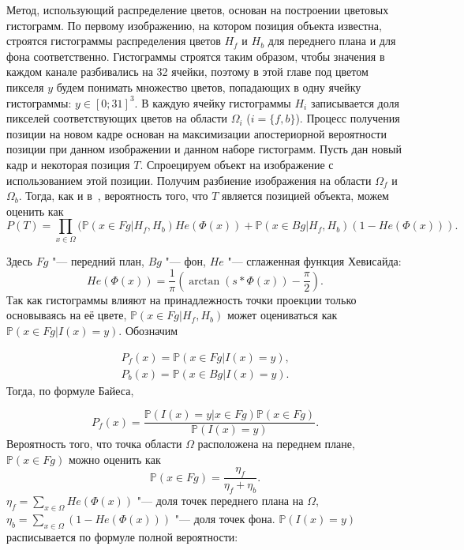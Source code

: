 Метод, использующий распределение цветов, основан на построении цветовых
гистограмм. По первому изображению, на котором позиция объекта известна,
строятся гистограммы распределения цветов $H_f$ и $H_b$ для переднего плана и
для фона соответственно. Гистограммы строятся таким образом, чтобы значения в
каждом канале разбивались на 32 ячейки, поэтому в этой главе под цветом пикселя
$y$ будем понимать множество цветов, попадающих в одну ячейку гистограммы: $y
\in [0; 31]^3$. В каждую ячейку гистограммы $H_i$ записывается доля пикселей
соответствующих цветов на области $\Omega_i$ ($i = \{f, b\}$).
Процесс получения позиции на новом кадре основан на максимизации апостериорной
вероятности позиции при данном изображении и данном наборе гистограмм. Пусть
дан новый кадр и некоторая позиция $T$. Спроецируем объект на изображение с
использованием этой позиции. Получим разбиение изображения на области
$\Omega_f$ и $\Omega_b$. Тогда, как и в~\cite{Hexner2016}, вероятность того,
что $T$ является позицией объекта, можем оценить как
\begin{equation} \label{eqn:pos_prob} P(T) = \prod\limits_{x \in
\Omega}(\mathbb{P}(x \in Fg | H_f, H_b) He(\Phi(x)) + \mathbb{P}(x \in Bg|H_f,
H_b)(1 - He(\Phi(x))) \text{.} \end{equation}

Здесь $Fg$ "--- передний план, $Bg$ "--- фон, $He$ "--- сглаженная функция
Хевисайда:
\begin{equation} \label{eqn:heaviside} He(\Phi(x)) = \frac{1}{\pi} (\arctan(s *
\Phi(x)) - \frac{\pi}{2}) \text{.} \end{equation}
Так как гистограммы влияют на принадлежность точки проекции только основываясь
на её цвете, $\mathbb{P}(x \in Fg | H_f, H_b)$ может оцениваться как
$\mathbb{P}(x \in Fg | I(x) = y)$.
Обозначим

\begin{equation} \label{eqn:Pfx} \begin{array}{c} P_f(x) = \mathbb{P}(x \in Fg
| I(x) = y) \text{,} \\ P_b(x) = \mathbb{P}(x \in Bg | I(x) = y) \text{.}
\end{array} \end{equation}
Тогда, по формуле Байеса,

\begin{equation} \label{eqn:Bayes} P_f(x)= \frac{\mathbb{P}(I(x) = y | x \in
Fg) \mathbb{P}(x \in Fg)}{\mathbb{P}(I(x) = y)} \text{.} \end{equation}
Вероятность того, что точка области $\Omega$ расположена на переднем плане,
$\mathbb{P}(x \in Fg)$ можно оценить как
\begin{equation} \label{eqn:P_x_Fg} \mathbb{P}(x \in Fg) = \frac{\eta_f}{\eta_f
+ \eta_b} \text{.} \end{equation}
$ \eta_f = \sum\limits_{x \in \Omega}He(\Phi(x)) $ "--- доля точек переднего
плана на $\Omega$,
$ \eta_b = \sum\limits_{x \in \Omega}(1 - He(\Phi(x))) $ "--- доля точек фона.
$\mathbb{P}(I(x) = y)$ расписывается по формуле полной вероятности:

